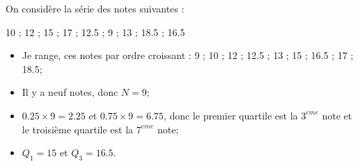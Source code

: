\documentclass[12pt,a4paper]{article}
\begin{document}
\begin{myex}
	On considère la série des notes suivantes : 
	
	\num{10} ; \num{12} ; \num{15} ; \num{17} ; \num{12.5} ; \num{9} ; \num{13} ; \num{18.5} ; \num{16.5}
	
	\begin{itemize}
		\item Je range, ces notes par ordre croissant :
		\num{9} ; \num{10} ; \num{12} ; \num{12.5} ; \num{13} ; \num{15} ; \num{16.5} ; \num{17} ; \num{18.5};
		
		\item Il y a neuf notes, donc $N = 9$;
		\item $\num{0.25} \times 9 = \num{2.25}$ et $\num{0.75} \times 9 = \num{6.75}$, donc le premier quartile est la $3^{eme}$ note et le troisième quartile est la $7^{eme}$ note;
		\item $Q_1 = 15$ et $Q_3 = \num{16.5}$.
	\end{itemize}
	
	
\end{myex}


%
%
%
\end{document}

